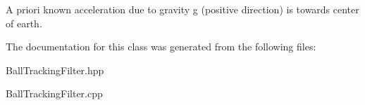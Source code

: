A priori known acceleration due to gravity g (positive direction) is towards center of earth. 



The documentation for this class was generated from the following files\+:\begin{DoxyCompactItemize}
\item 
Ball\+Tracking\+Filter.\+hpp\item 
Ball\+Tracking\+Filter.\+cpp\end{DoxyCompactItemize}
